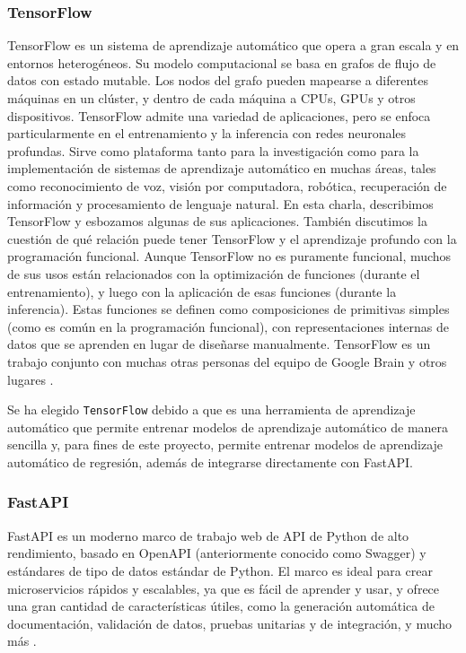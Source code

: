 \subsubsection{TensorFlow}

TensorFlow es un sistema de aprendizaje automático que opera a gran escala y en
entornos heterogéneos. Su modelo computacional se basa en grafos de flujo de
datos con estado mutable. Los nodos del grafo pueden mapearse a diferentes
máquinas en un clúster, y dentro de cada máquina a CPUs, GPUs y otros
dispositivos. TensorFlow admite una variedad de aplicaciones, pero se enfoca
particularmente en el entrenamiento y la inferencia con redes neuronales
profundas. Sirve como plataforma tanto para la investigación como para la
implementación de sistemas de aprendizaje automático en muchas áreas, tales
como reconocimiento de voz, visión por computadora, robótica, recuperación de
información y procesamiento de lenguaje natural. En esta charla, describimos
TensorFlow y esbozamos algunas de sus aplicaciones. También discutimos la
cuestión de qué relación puede tener TensorFlow y el aprendizaje profundo con
la programación funcional. Aunque TensorFlow no es puramente funcional, muchos
de sus usos están relacionados con la optimización de funciones (durante el
entrenamiento), y luego con la aplicación de esas funciones (durante la
inferencia). Estas funciones se definen como composiciones de primitivas
simples (como es común en la programación funcional), con representaciones
internas de datos que se aprenden en lugar de diseñarse manualmente. TensorFlow
es un trabajo conjunto con muchas otras personas del equipo de Google Brain y
otros lugares \cite{abadi2016tensorflow}.

Se ha elegido \texttt{TensorFlow} debido a que es una herramienta de aprendizaje
automático que permite entrenar modelos de aprendizaje automático de manera
sencilla y, para fines de este proyecto, permite entrenar modelos de aprendizaje
automático de regresión, además de integrarse directamente con FastAPI.

\subsubsection{FastAPI}

FastAPI es un moderno marco de trabajo web de API de Python de alto rendimiento, basado en
OpenAPI (anteriormente conocido como Swagger) y estándares de tipo de datos
estándar de Python. El marco es ideal para crear microservicios rápidos y
escalables, ya que es fácil de aprender y usar, y ofrece una gran cantidad de
características útiles, como la generación automática de documentación,
validación de datos, pruebas unitarias y de integración, y mucho más \cite{voron2023building}.


